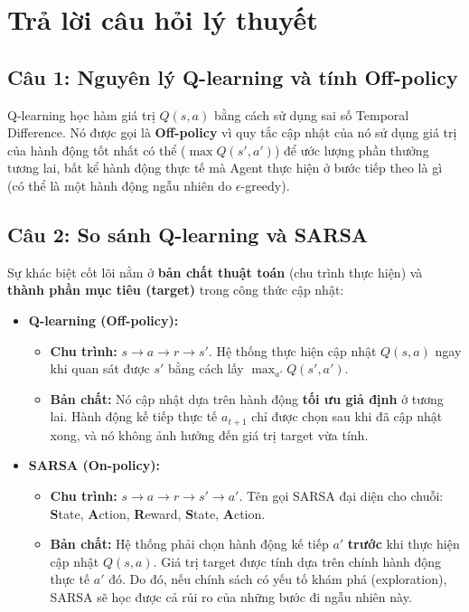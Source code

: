 \section{Trả lời câu hỏi lý thuyết}

\subsection{Câu 1: Nguyên lý Q-learning và tính Off-policy}
Q-learning học hàm giá trị $Q(s, a)$ bằng cách sử dụng sai số Temporal Difference. Nó được gọi là \textbf{Off-policy} vì quy tắc cập nhật của nó sử dụng giá trị của hành động tốt nhất có thể ($\max Q(s', a')$) để ước lượng phần thưởng tương lai, bất kể hành động thực tế mà Agent thực hiện ở bước tiếp theo là gì (có thể là một hành động ngẫu nhiên do $\epsilon$-greedy).

\subsection{Câu 2: So sánh Q-learning và SARSA}
Sự khác biệt cốt lõi nằm ở \textbf{bản chất thuật toán} (chu trình thực hiện) và \textbf{thành phần mục tiêu (target)} trong công thức cập nhật:

\begin{itemize}
    \item \textbf{Q-learning (Off-policy):} 
    \begin{itemize}
        \item \textbf{Chu trình:} $s \to a \to r \to s'$. Hệ thống thực hiện cập nhật $Q(s,a)$ ngay khi quan sát được $s'$ bằng cách lấy $\max_{a'} Q(s', a')$. 
        \item \textbf{Bản chất:} Nó cập nhật dựa trên hành động \textbf{tối ưu giả định} ở tương lai. Hành động kế tiếp thực tế $a_{t+1}$ chỉ được chọn sau khi đã cập nhật xong, và nó không ảnh hưởng đến giá trị target vừa tính.
    \end{itemize}
    \item \textbf{SARSA (On-policy):} 
    \begin{itemize}
        \item \textbf{Chu trình:} $s \to a \to r \to s' \to a'$. Tên gọi SARSA đại diện cho chuỗi: \textbf{S}tate, \textbf{A}ction, \textbf{R}eward, \textbf{S}tate, \textbf{A}ction. 
        \item \textbf{Bản chất:} Hệ thống phải chọn hành động kế tiếp $a'$ \textbf{trước} khi thực hiện cập nhật $Q(s,a)$. Giá trị target được tính dựa trên chính hành động thực tế $a'$ đó. Do đó, nếu chính sách có yếu tố khám phá (exploration), SARSA sẽ học được cả rủi ro của những bước đi ngẫu nhiên này.
    \end{itemize}
\end{itemize}

